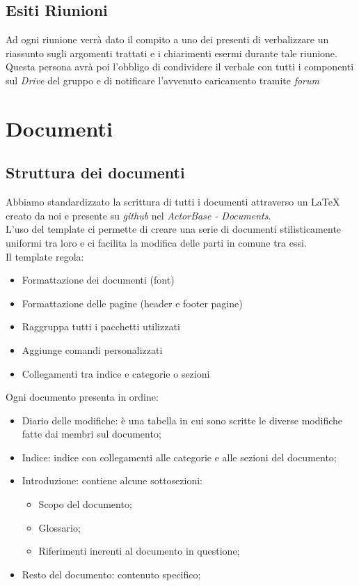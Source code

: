 \documentclass{scalatekids-article}
\begin{document}
\subsection{Esiti Riunioni}
Ad ogni riunione verrà dato il compito a uno dei presenti di verbalizzare un riassunto sugli argomenti trattati e i chiarimenti esermi durante tale riunione.\\
Questa persona avrà poi l'obbligo di condividere il verbale con tutti i componenti sul \textit{Drive} del gruppo e di notificare l'avvenuto caricamento tramite \textit{forum}

\section{Documenti}

\subsection{Struttura dei documenti}
Abbiamo standardizzato la scrittura di tutti i documenti attraverso un  \LaTeX\xspace creato da noi e presente su \textit{github} nel  \textit{ActorBase - Documents}.\\
L'uso del template ci permette di creare una serie di documenti stilisticamente uniformi tra loro e ci facilita la modifica delle parti in comune tra essi.\\
Il template regola:
\begin{itemize}
\item Formattazione dei documenti (font)
\item Formattazione delle pagine (header e footer pagine)
\item Raggruppa tutti i pacchetti utilizzati
\item Aggiunge comandi personalizzati
\item Collegamenti tra indice e categorie o sezioni
\end{itemize}

Ogni documento presenta in ordine:
\begin{itemize}
\item Diario delle modifiche: è una tabella in cui sono scritte le diverse modifiche fatte dai membri sul documento;
\item Indice: indice con collegamenti alle categorie e alle sezioni del documento;
\item Introduzione: contiene alcune sottosezioni:
  \begin{itemize}
  \item Scopo del documento;
  \item Glossario;
  \item Riferimenti inerenti al documento in questione;
  \end{itemize}
\item Resto del documento: contenuto specifico;
\end{itemize}
\end{document}
